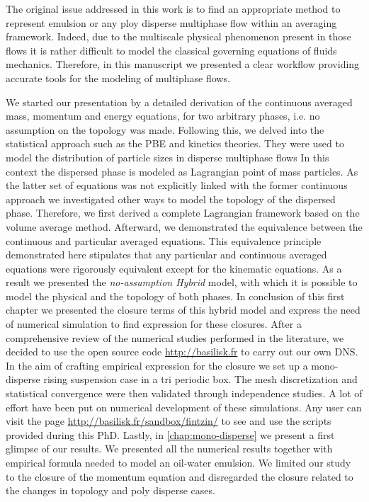 
The original issue addressed in this work is to find an appropriate method to represent emulsion or any ploy disperse multiphase flow within an averaging framework.
Indeed, due to the multiscale physical phenomenon present in those flows it is rather difficult to model the classical governing equations of fluids mechanics.  
Therefore, in this manuscript we presented a clear workflow providing accurate tools for the modeling of multiphase flows. 

We started our presentation by a detailed derivation of the continuous averaged mass, momentum and energy equations, for two arbitrary phases, i.e. no assumption on the topology was made.
Following this, we delved into the statistical approach such as the PBE and kinetics theories.
They were used to model the distribution of particle sizes in disperse multiphase flows
In this context the dispersed phase is modeled as Lagrangian point of mass particles. 
As the latter set of equations was not explicitly linked with the former continuous approach we investigated other ways to model the topology of the dispersed phase. 
Therefore, we first derived a complete Lagrangian framework based on the volume average method. 
Afterward, we demonstrated the equivalence between the continuous and particular averaged equations.
This equivalence principle demonstrated here stipulates that any particular and continuous averaged equations were rigorously equivalent except for the kinematic equations. 
As a result we presented the \textit{no-assumption Hybrid} model, with which it is possible to model the physical and the topology of both phases. 
In conclusion of this first chapter we presented the closure terms of this hybrid model and express the need of numerical simulation to find expression for these closures. 
After a comprehensive review of the numerical studies performed in the literature, we decided to use the open source code \url{http://basilisk.fr} to carry out our own DNS.
In the aim of crafting empirical expression for the closure we set up a mono-disperse rising suspension case in a tri periodic box.
The mesh discretization and statistical convergence were then validated through independence studies. 
A lot of effort have been put on numerical development of these simulations. 
Any user can visit the page \url{http://basilisk.fr/sandbox/fintzin/} to see and use the scripts provided during this PhD. 
Lastly, in \ref{chap:mono-disperse} we present a first glimpse of our results.
We presented all the numerical results together with empirical formula needed to model an oil-water emulsion. 
We limited our study to the closure of the momentum  equation and disregarded the closure related to the changes in topology and poly disperse cases. 

